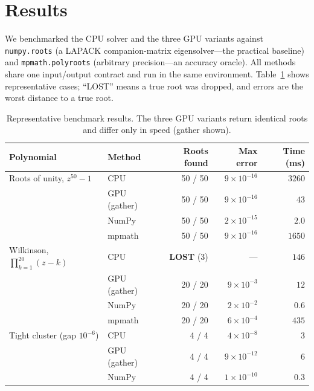 \documentclass[11pt]{article}
\begin{document}
\section{Results}
We benchmarked the CPU solver and the three GPU variants against
\texttt{numpy.roots} (a LAPACK companion-matrix eigensolver---the practical
baseline) and \texttt{mpmath.polyroots} (arbitrary precision---an accuracy
oracle). All methods share one input/output contract and run in the same
environment. Table~\ref{tab:results} shows representative cases; ``LOST'' means
a true root was dropped, and errors are the worst distance to a true root.

\begin{table}[h]
\centering
\small
\begin{tabular}{llrrr}
\toprule
Polynomial & Method & Roots found & Max error & Time (ms) \\
\midrule
Roots of unity, $z^{50}-1$ & CPU        & 50 / 50 & $9\!\times\!10^{-16}$ & $3260$ \\
                           & GPU (gather)& 50 / 50 & $9\!\times\!10^{-16}$ & $43$   \\
                           & NumPy      & 50 / 50 & $2\!\times\!10^{-15}$ & $2.0$  \\
                           & mpmath     & 50 / 50 & $9\!\times\!10^{-16}$ & $1650$ \\
\midrule
Wilkinson, $\prod_{k=1}^{20}(z-k)$ & CPU   & \textbf{LOST} (3) & --- & $146$ \\
                           & GPU (gather)& 20 / 20 & $9\!\times\!10^{-3}$ & $12$   \\
                           & NumPy      & 20 / 20 & $2\!\times\!10^{-2}$ & $0.6$  \\
                           & mpmath     & 20 / 20 & $6\!\times\!10^{-4}$ & $435$  \\
\midrule
Tight cluster (gap $10^{-6}$) & CPU     & 4 / 4 & $4\!\times\!10^{-8}$ & $3$ \\
                           & GPU (gather)& 4 / 4 & $9\!\times\!10^{-12}$ & $6$   \\
                           & NumPy      & 4 / 4 & $1\!\times\!10^{-10}$ & $0.3$  \\
\bottomrule
\end{tabular}
\caption{Representative benchmark results. The three GPU variants return
identical roots and differ only in speed (gather shown).}
\label{tab:results}
\end{table}
\end{document}
